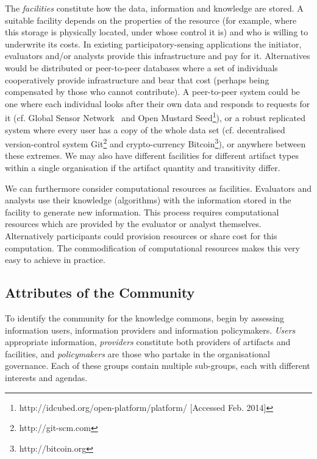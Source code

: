 The \emph{facilities} constitute how the data, information and knowledge are stored. A suitable facility depends on the properties of the resource (for example, where this storage is physically located, \ie under whose control it is) and who is willing to underwrite its costs.  In existing participatory-sensing applications the initiator, evaluators and/or analysts provide this infrastructure and pay for it. Alternatives would be distributed or peer-to-peer databases where a set of individuals cooperatively provide infrastructure and bear that cost (perhaps being compensated by those who cannot contribute). 
A peer-to-peer system could be one where each individual looks after their own data and responds to requests for it (cf. Global Sensor Network~\citep{Aberer2006} and Open Mustard Seed\footnote{http://idcubed.org/open-platform/platform/ [Accessed Feb. 2014]}), or a robust replicated system where every user has a copy of the whole data set (cf. decentralised version-control system Git\footnote{http://git-scm.com} and crypto-currency Bitcoin\footnote{http://bitcoin.org}), or anywhere between these extremes. 
We may also have different facilities for different artifact types within a single organisation if the artifact quantity and transitivity differ.

We can furthermore consider computational resources as facilities.
Evaluators and analysts use their knowledge (\ie algorithms) with the information stored in the facility to generate new information. This process requires computational resources which are provided by the evaluator or analyst themselves. Alternatively participants could provision resources or share cost for this computation. The commodification of computational resources makes this very easy to achieve in practice.

\subsection{Attributes of the Community}

To identify the community for the knowledge commons,  begin by assessing information users, information providers and information policymakers. 
\emph{Users} appropriate information, \emph{providers} constitute both providers of artifacts and facilities, and \emph{policymakers} are those who partake in the organisational governance. 
Each of these groups contain multiple sub-groups, each with different interests and agendas.

